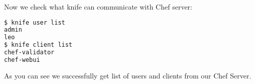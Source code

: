 Now we check what knife can communicate with Chef server:

\begin{lstlisting}[language=Bash,label=lst:my-server-cloud-knife5]
$ knife user list
admin
leo
$ knife client list
chef-validator
chef-webui
\end{lstlisting}

As you can see we successfully get list of users and clients from our Chef Server.
